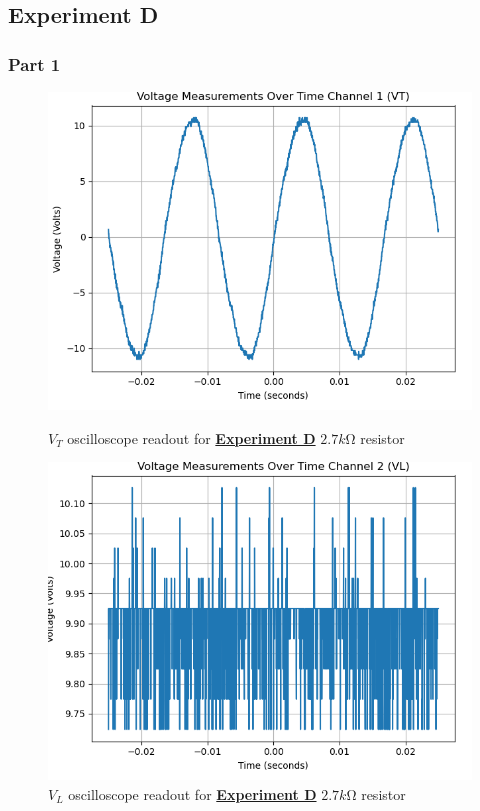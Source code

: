 \documentclass[
	letterpaper
	12pt
]{template}
\newcommand{\bref}[2]{\textbf{\hyperref[#1]{#2}}}
\begin{document}
\subsection{Experiment D}
\subsubsection{Part 1}
\begin{figure}[H]\label{data::D}
	\centering
	\begin{minipage}[c]{0.45\textwidth}
		\centering
		\includegraphics[width=\textwidth]{figures/D/1--ch1.png}
	    \caption{$V_{T}$ oscilloscope readout for \bref{exp::D}{Experiment D} $2.7\unit{k\ohm}$ resistor}
	\end{minipage}
	\hfill
	\begin{minipage}[c]{0.45\textwidth}
		\centering
		\includegraphics[width=\textwidth]{figures/D/1--ch2.png}
	    \caption{$V_{L}$ oscilloscope readout for \bref{exp::D}{Experiment D} $2.7\unit{k\ohm}$ resistor}
	\end{minipage}
\end{figure}
\end{document}
